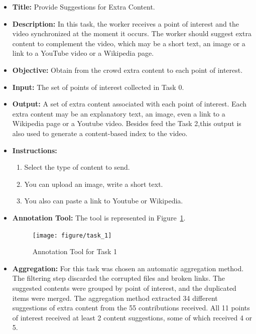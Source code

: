 \begin{itemize}

\item \textbf{Title:} Provide Suggestions for Extra Content.

\item \textbf{Description:} In this task, the worker receives a point of interest and the video synchronized at the moment it occurs. The worker should suggest extra content to complement the video, which may be a short text, an image or a link to a YouTube video or a Wikipedia page.

\item \textbf{Objective:} Obtain from the crowd extra content to each point of interest.


\item \textbf{Input:} The set of points of interest collected in Task 0.


\item \textbf{Output:} A set of extra content associated with each point of interest. Each extra content may be an explanatory text, an image, even a link to a Wikipedia page or a Youtube video. Besides feed the Task 2,this output is also used to generate a content-based index to the video.


\item \textbf{Instructions:} \begin{enumerate}
	\item Select the type of content to send.
	\item You can upload an image, write a short text.
	\item You also can paste a link to Youtube or Wikipedia.
\end{enumerate}

\item \textbf{Annotation Tool:} The tool is represented in Figure~\ref{task_1}.
\begin{figure}[h!]
	\centerline{\texttt{[image: figure/task\_1]}}
	\caption{Annotation Tool for Task 1}
	\label{task_1}
\end{figure}

\item \textbf{Aggregation:} For this task was chosen an automatic aggregation method. The filtering step discarded the corrupted files and broken links. The suggested contents were grouped by point of interest, and the duplicated items were merged. The aggregation method extracted 34 different suggestions of extra content from the 55 contributions received. All 11 points of interest received at least 2 content suggestions, some of which received 4 or 5. 

\end{itemize}



